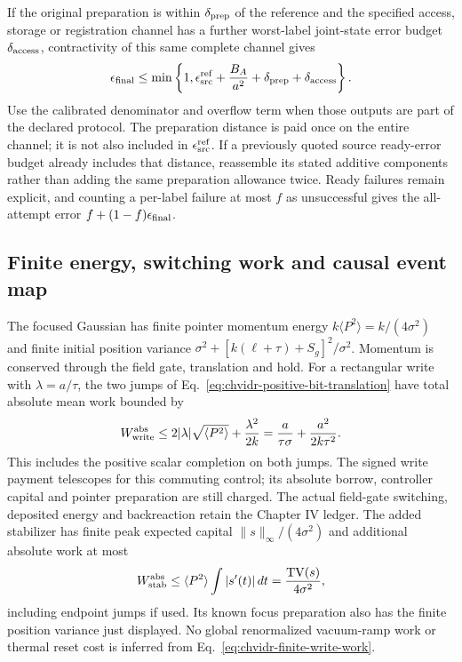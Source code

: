 If the original preparation is within $\delta_{\rm prep}$ of the
reference and the specified access, storage or registration channel has
a further worst-label joint-state error budget $\delta_{\rm access}$,
contractivity of this same complete channel gives
\begin{equation}
 \epsilon_{\rm final}\leq\min\left\{1,
   \epsilon_{\rm src}^{\rm ref}+\frac{B_A}{a^2}
                  +\delta_{\rm prep}+\delta_{\rm access}\right\}.
 \label{eq:chvidr-all-outcome-error-budget}
\end{equation}
Use the calibrated denominator and overflow term when those outputs are
part of the declared protocol. The preparation distance is paid once on
the entire channel; it is not also included in
$\epsilon_{\rm src}^{\rm ref}$. If a previously quoted source ready-error
budget already includes that distance, reassemble its stated additive
components rather than adding the same preparation allowance twice.
Ready failures remain explicit, and counting a per-label failure at
most $f$ as unsuccessful gives the all-attempt error
$f+(1-f)\epsilon_{\rm final}$.

\subsection{Finite energy, switching work and causal event map}
\label{sec:chvidr-write-resources}

The focused Gaussian has finite pointer momentum energy
$k\langle P^2\rangle=k/(4\sigma^2)$ and finite initial position
variance $\sigma^2+[k(\ell+\tau)+S_g]^2/\sigma^2$. Momentum is conserved
through the field gate, translation and hold. For a rectangular write
with $\lambda=a/\tau$, the two jumps of
Eq.~\eqref{eq:chvidr-positive-bit-translation} have total absolute mean
work bounded by
\begin{equation}
 W_{\rm write}^{\rm abs}
     \leq2|\lambda|\sqrt{\langle P^2\rangle}
                   +\frac{\lambda^2}{2k}
     =\frac{a}{\tau\sigma}+\frac{a^2}{2k\tau^2}.
 \label{eq:chvidr-finite-write-work}
\end{equation}
This includes the positive scalar completion on both jumps. The signed
write payment telescopes for this commuting control; its absolute borrow,
controller capital and pointer preparation are still charged. The actual
field-gate switching, deposited energy and backreaction retain the Chapter IV
ledger. The added stabilizer has finite peak expected capital
$\|s\|_\infty/(4\sigma^2)$ and additional absolute work at most
\begin{equation}
 W_{\rm stab}^{\rm abs}\leq
       \langle P^2\rangle\int|s'(t)|\,dt
       =\frac{\operatorname{TV}(s)}{4\sigma^2},
 \label{eq:chvidr-stabilizer-work}
\end{equation}
including endpoint jumps if used. Its known focus preparation also has
the finite position variance just displayed. No global renormalized
vacuum-ramp work or thermal reset cost is
inferred from Eq.~\eqref{eq:chvidr-finite-write-work}.

